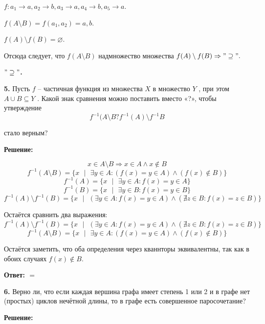\documentclass[a4paper,12pt]{article} %
\begin{document}
$f : a_1 \rightarrow a, a_2 \rightarrow b, a_3 \rightarrow a, a_4 \rightarrow b, a_5 \rightarrow a.$

$f(A \setminus B) = f(a_1,a_2) = a, b.$

$f(A) \setminus f(B) = \varnothing.$

Отсюда следует, что $f(A \setminus B)$ надмножество множества $f(A) \setminus f(B) \Rightarrow "\supseteq".$

\begin{flushright}
\begin{large}
\textbf {$"\supseteq"$. }
\end{large}
\end{flushright}
{\bf 5.} Пусть $f$ -- частичная функция из множества $X$ в множество $Y$ , при
этом $A \cup B \subseteq Y$ . Какой знак сравнения можно поставить вместо «?»,
чтобы утверждение \[ f^{-1}(A \setminus B ? f^{-1}(A)\setminus f^{-1}B \]

стало верным?
\begin{center}
\bfseries
{\Large Решение: }
\end{center}

\[x \in A \setminus B \Rightarrow x \in A \wedge x \notin B\]
\[f^{-1}(A \setminus B) = \lbrace x \text{ }|\text{ } \exists y \in A : (f(x) = y \in A) \wedge (f(x) \notin B )\rbrace\]
\[f^{-1}(A) = \lbrace x \text{ }|\text{ } \exists y \in A: f(x) = y \in A \rbrace\]
\[f^{-1}(B) = \lbrace x \text{ }|\text{ } \exists y \in B: f(x) = y \in B \rbrace\]
\[f^{-1}(A) \setminus f^{-1}(B) = \lbrace x \text{ }|\text{ } (\exists y \in A: f(x) = y \in A) \wedge (\nexists z \in B: f(x) = z \in B) \rbrace\]

Остаётся сравнить два выражения:
\[f^{-1}(A) \setminus f^{-1}(B) = \lbrace x \text{ }|\text{ } (\exists y \in A: f(x) = y \in A) \wedge (\nexists z \in B: f(x) = z \in B) \rbrace\]
\[f^{-1}(A \setminus B) = \lbrace x \text{ }|\text{ } \exists y \in A : (f(x) = y \in A) \wedge (f(x) \notin B )\rbrace\]

Остаётся заметить, что оба определения через кваннторы эквивалентны, так как в обоих случаях $f(x) \notin B$.  

\begin{flushright}
\begin{large}
\textbf {Ответ: $=$}
\end{large}
\end{flushright}
{\bf 6.} Верно ли, что если каждая вершина графа имеет степень 1 или
2 и в графе нет (простых) циклов нечётной длины, то в графе есть
совершенное паросочетание?
\begin{center}
\bfseries
{\Large Решение: }
\end{center}
\end{document}
